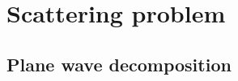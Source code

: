 
\chapter{Scattering problem} %
\label{Chapter5}


\section{Plane wave decomposition}





\cleardoublepage